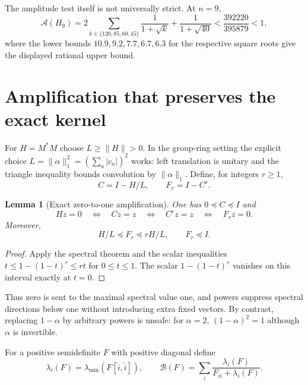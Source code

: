 \documentclass[11pt,a4paper,oneside]{report}
\newtheorem{lemma}[theorem]{Lemma}
\theoremstyle{definition}
\theoremstyle{remark}
\newcommand{\BB}{\mathcal B}
\newcommand{\ABudget}{\mathcal A}
\begin{document}
The amplitude test itself is not universally strict. At $n=9$,
\[
 \ABudget(H_9)=2\sum_{k\in\{120,85,60,45\}}\frac1{1+\sqrt k}
           +\frac1{1+\sqrt{40}}
 <\frac{392220}{395879}<1,
\]
where the lower bounds $10.9,9.2,7.7,6.7,6.3$ for the respective
square roots give the displayed rational upper bound.

\section{Amplification that preserves the exact kernel}
\label{M05:sec:power}

For $H=M^*M$ choose $L\ge\|H\|>0$. In the group-ring setting the
explicit choice
$L=\|\alpha\|_1^2=(\sum_a|c_a|)^2$ works: left translation is
unitary and the triangle inequality bounds convolution by
$\|\alpha\|_1$.
Define, for integers $r\ge1$,
\begin{equation}\label{M05:eq:filter}
 C=I-H/L,\qquad F_r=I-C^r .
\end{equation}

\begin{lemma}[Exact zero-to-one amplification]\label{M05:lem:power}
One has $0\preceq C\preceq I$ and
\begin{equation}\label{M05:eq:kerpreserve}
 Hz=0\quad\Longleftrightarrow\quad Cz=z
 \quad\Longleftrightarrow\quad C^rz=z
 \quad\Longleftrightarrow\quad F_rz=0.
\end{equation}
Moreover,
\begin{equation}\label{M05:eq:filterbounds}
 H/L\preceq F_r\preceq rH/L,\qquad F_r\preceq I.
\end{equation}
\end{lemma}
\begin{proof}
Apply the spectral theorem and the scalar inequalities
$t\le1-(1-t)^r\le rt$ for $0\le t\le1$.
The scalar $1-(1-t)^r$ vanishes on this interval exactly at $t=0$.
\end{proof}
Thus zero is sent to the maximal spectral value one, and powers
suppress spectral directions below one without introducing extra
fixed vectors. By contrast, replacing $1-\alpha$ by arbitrary
powers is unsafe: for $\alpha=2$, $(1-\alpha)^2=1$ although
$\alpha$ is invertible.

For a positive semidefinite $F$ with positive diagonal define
\begin{equation}\label{M05:eq:quadraticbudget}
 \lambda_i(F)=\lambda_{\min}(F[\widehat i,\widehat i]),\qquad
 \BB(F)=\sum_i\frac{\lambda_i(F)}{F_{ii}+\lambda_i(F)} .
\end{equation}
\end{document}
